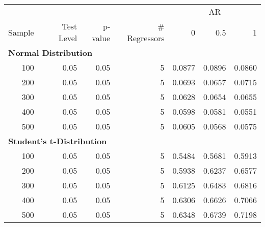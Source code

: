 \begin{table}
\centering
\begin{tabular}{r|r|r|r|r|r|r}
\hline
\multicolumn{4}{c|}{ } & \multicolumn{3}{c}{AR} \\
\cline{5-7}
Sample & Test Level & p-value & \# Regressors & 0 & 0.5 & 1\\
\hline
\multicolumn{7}{l}{\textbf{Normal Distribution}}\\
\hline
\hspace{1em}100 & 0.05 & 0.05 & 5 & 0.0877 & 0.0896 & 0.0860\\
\hline
\hspace{1em}200 & 0.05 & 0.05 & 5 & 0.0693 & 0.0657 & 0.0715\\
\hline
\hspace{1em}300 & 0.05 & 0.05 & 5 & 0.0628 & 0.0654 & 0.0655\\
\hline
\hspace{1em}400 & 0.05 & 0.05 & 5 & 0.0598 & 0.0581 & 0.0551\\
\hline
\hspace{1em}500 & 0.05 & 0.05 & 5 & 0.0605 & 0.0568 & 0.0575\\
\hline
\multicolumn{7}{l}{\textbf{Student's t-Distribution}}\\
\hline
\hspace{1em}100 & 0.05 & 0.05 & 5 & 0.5484 & 0.5681 & 0.5913\\
\hline
\hspace{1em}200 & 0.05 & 0.05 & 5 & 0.5938 & 0.6237 & 0.6577\\
\hline
\hspace{1em}300 & 0.05 & 0.05 & 5 & 0.6125 & 0.6483 & 0.6816\\
\hline
\hspace{1em}400 & 0.05 & 0.05 & 5 & 0.6306 & 0.6626 & 0.7066\\
\hline
\hspace{1em}500 & 0.05 & 0.05 & 5 & 0.6348 & 0.6739 & 0.7198\\
\hline
\end{tabular}
\end{table}

